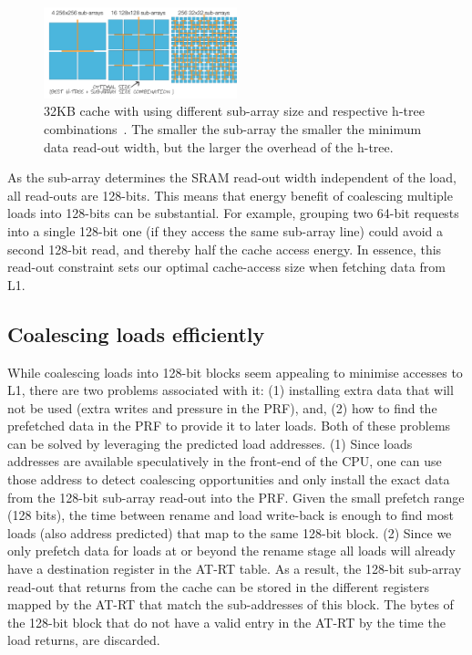 \documentclass{sig-alternate}
\begin{document}
\begin{figure}[ht]
\centerline{\includegraphics[width=0.50\textwidth]{diagrams/sub-array.pdf}}
\caption{32KB cache with using different sub-array size and respective h-tree combinations~\cite{SBAC-PAD/2017addressing}. The smaller the sub-array the smaller the minimum data read-out width, but the larger the overhead of the h-tree.}
\label{fig:sub-arrray}
\end{figure}


As the sub-array determines the SRAM read-out width independent of the load, all read-outs are 128-bits. This means that energy benefit of coalescing multiple loads into 128-bits can be substantial. For example, grouping two 64-bit requests into a single 128-bit one (if they access the same sub-array line) could avoid a second 128-bit read, and thereby half the cache access energy. In essence, this read-out constraint sets our optimal cache-access size when fetching data from L1.


\subsection{Coalescing loads efficiently}
While coalescing loads into 128-bit blocks seem appealing to minimise accesses to L1, there are two problems associated with it: (1) installing extra data that will not be used (extra writes and pressure in the PRF), and, (2) how to find the prefetched data in the PRF to provide it to later loads. Both of these problems can be solved by leveraging the predicted load addresses. (1) Since loads addresses are available speculatively in the front-end of the CPU, one can use those address to detect coalescing opportunities and only install the exact data from the 128-bit sub-array read-out into the PRF. Given the small prefetch range (128 bits), the time between rename and load write-back is enough to find most loads (also address predicted) that map to the same 128-bit block. (2) Since we only prefetch data for loads at or beyond the rename stage all loads will already have a destination register in the AT-RT table. As a result, the 128-bit sub-array read-out that returns from the cache can be stored in the different registers mapped by the AT-RT that match the sub-addresses of this block. The bytes of the 128-bit block that do not have a valid entry in the AT-RT by the time the load returns, are discarded.
\end{document}

